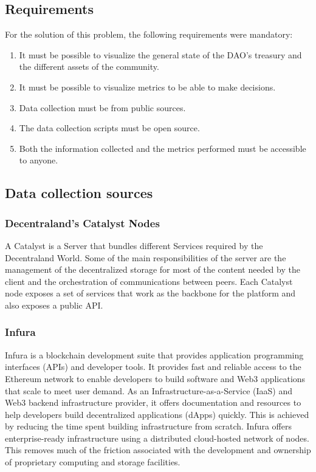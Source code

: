 \documentclass[MSE,Master,english]{twbook}%
\begin{document}
\subsection{Requirements}
For the solution of this problem, the following requirements were mandatory:
\begin{enumerate}
  \item It must be possible to visualize the general state of the DAO's treasury and the different assets of the community.
  \item It must be possible to visualize metrics to be able to make decisions.
  \item Data collection must be from public sources.
  \item The data collection scripts must be open source.
  \item Both the information collected and the metrics performed must be accessible to anyone.
\end{enumerate}

\subsection{Data collection sources}
\subsubsection{Decentraland's Catalyst Nodes}
A Catalyst\cite{catalyst} is a Server that bundles different Services required by the Decentraland World. Some of the main responsibilities of the server are the management of the decentralized storage for most of the content needed by the client and the orchestration of communications between peers. Each Catalyst node exposes a set of services that work as the backbone for the platform and also exposes a public API.


\subsubsection{Infura}
Infura\cite{infura} is a blockchain development suite that provides application programming interfaces (APIs) and developer tools. It provides fast and reliable access to the Ethereum network to enable developers to build software and Web3 applications that scale to meet user demand.
As an Infrastructure-as-a-Service (IaaS) and Web3 backend infrastructure provider, it offers documentation and resources to help developers build decentralized applications (dApps) quickly. This is achieved by reducing the time spent building infrastructure from scratch. Infura offers enterprise-ready infrastructure using a distributed cloud-hosted network of nodes. This removes much of the friction associated with the development and ownership of proprietary computing and storage facilities. 
\end{document}
